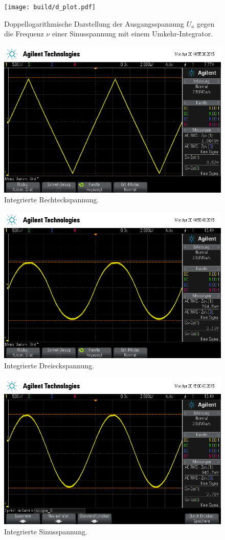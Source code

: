 \begin{figure}[!h]
    \centering
    \texttt{[image: build/d\_plot.pdf]}
    \caption{Doppellogarithmische Darstellung der Ausgangsspannung $U_a$ gegen die Frequenz $\nu$ einer Sinusspannung mit einem Umkehr-Integrator.}
    \label{fig:d_int_fig}
\end{figure}

\begin{figure}[!h]
    \centering
    \includegraphics[width=0.8\linewidth]{data/scope_4.png}
    \caption{Integrierte Rechteckspannung.}
    \label{fig:int_rechteck}
\end{figure}

\begin{figure}[!h]
    \centering
    \includegraphics[width=0.8\linewidth]{data/scope_5.png}
    \caption{Integrierte Dreieckspannung.}
    \label{fig:int_dreieck}
\end{figure}

\begin{figure}[!h]
    \centering
    \includegraphics[width=0.8\linewidth]{data/scope_6.png}
    \caption{Integrierte Sinusspannung.}
    \label{fig:int_sinus}
\end{figure}

